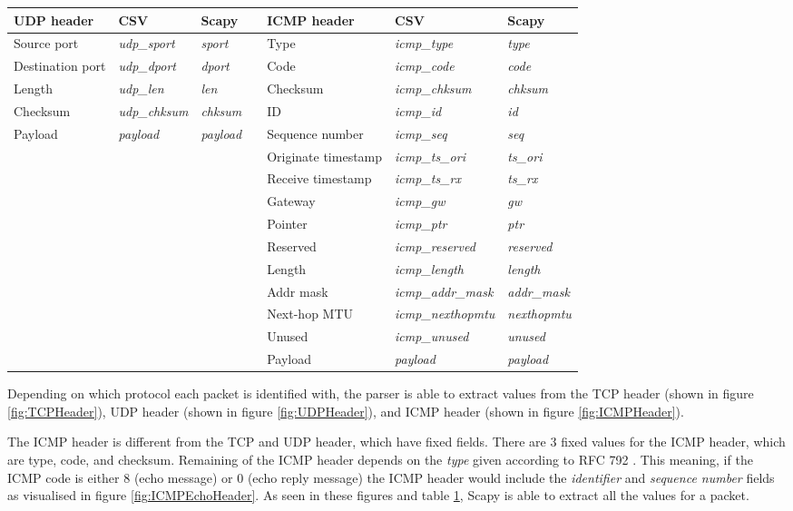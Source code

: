 \begin{table}[htbp]
\begin{center}
\begin{tabular}{|l|l|l|l|l|l|l|}
\hline
UDP header & CSV & Scapy &&  ICMP header & CSV & Scapy\\
\hline
Source port & \textit{udp\_sport}&\textit{sport}&& Type & \textit{icmp\_type} & \textit{type}\\
\hline
Destination port & \textit{udp\_dport}&\textit{dport}&& Code & \textit{icmp\_code} & \textit{code}\\
\hline
Length & \textit{udp\_len}&\textit{len}&& Checksum & \textit{icmp\_chksum} & \textit{chksum}\\
\hline
Checksum & \textit{udp\_chksum}&\textit{chksum}&& ID & \textit{icmp\_id} & \textit{id}\\
\hline
Payload & \textit{payload}&\textit{payload}&& Sequence number & \textit{icmp\_seq} & \textit{seq}\\
\hline
& &&& Originate timestamp & \textit{icmp\_ts\_ori} & \textit{ts\_ori}\\
\hline
& &&& Receive timestamp & \textit{icmp\_ts\_rx} & \textit{ts\_rx}\\
\hline
& &&& Gateway & \textit{icmp\_gw} & \textit{gw}\\
\hline
& &&& Pointer  & \textit{icmp\_ptr} & \textit{ptr}\\
\hline
& &&& Reserved & \textit{icmp\_reserved} & \textit{reserved}\\
\hline
& &&& Length & \textit{icmp\_length} & \textit{length}\\
\hline
& &&& Addr mask & \textit{icmp\_addr\_mask} & \textit{addr\_mask}\\
\hline
& &&& Next-hop MTU & \textit{icmp\_nexthopmtu} & \textit{nexthopmtu}\\
\hline
& &&& Unused & \textit{icmp\_unused} & \textit{unused}\\
\hline
& &&& Payload & \textit{payload} & \textit{payload}\\
\hline
\end{tabular}
\label{tbl:IPScapySimilarities}
\end{center}
\end{table}


Depending on which protocol each packet is identified with, the parser is able to extract values from the TCP header (shown in figure \ref{fig:TCPHeader}), UDP header (shown in figure \ref{fig:UDPHeader}), and ICMP header (shown in figure \ref{fig:ICMPHeader}).

The ICMP header is different from the TCP and UDP header, which have fixed fields.
There are 3 fixed values for the ICMP header, which are type, code, and checksum.
Remaining of the ICMP header depends on the \textit{type} given according to RFC 792 \autocite{rfc792}.
This meaning, if the ICMP code is either $8$ (echo message) or $0$ (echo reply message) the ICMP header would include the \textit{identifier} and \textit{sequence number} fields as visualised in figure \ref{fig:ICMPEchoHeader}.
As seen in these figures and table \ref{tbl:IPScapySimilarities}, Scapy is able to extract all the values for a packet.


